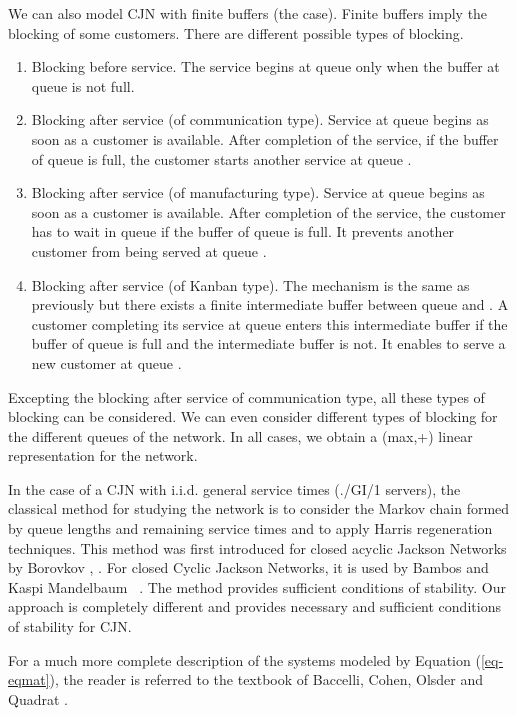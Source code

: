 \documentclass[11pt,titlepage]{article}
\newcommand{\parag}{\medskip\noindent}
\begin{document}
We can 
also model CJN with 
finite buffers (the  case).
Finite buffers imply the blocking of some customers. There are different
possible types of blocking.
\begin{enumerate}
\item Blocking before service. The service begins
at queue  only when the buffer at queue  is not full.
\item Blocking after service (of communication type). Service at queue 
begins as soon as a customer is available. After completion of the service,
if the buffer of queue  is full, the customer starts another service at
 queue .
\item Blocking after service (of manufacturing type). Service at queue 
begins as soon as a customer is available. After completion of the service,
the customer has to wait in queue  if the buffer of queue  is full.
It prevents another customer from being served at queue .
\item Blocking after service (of Kanban type). The mechanism is the same as
previously but there exists a finite intermediate buffer between queue  and
. A 
customer completing its service at queue  enters this intermediate buffer
if 
the buffer of queue  is full and the intermediate buffer is not. 
It enables to serve a new 
customer at queue .
\end{enumerate}
Excepting the blocking after service of communication type, all these types of
blocking can be considered. We can even consider different types of blocking
for the different queues of the network. In all cases, we obtain 
a (max,+) 
linear representation for the network.

\parag
In the case of a CJN with i.i.d. general
service 
times (./GI/1 servers), the classical method for studying the
network is to
consider the Markov chain formed by queue lengths and
remaining service times and to apply Harris regeneration techniques. 
This method was first introduced for closed
acyclic Jackson Networks by Borovkov \cite{boro86}, \cite{boro88}. For closed
Cyclic Jackson Networks, it is used by
Bambos \cite{bamb} and 
Kaspi  Mandelbaum \cite{KaMa92}~\cite{KaMa94}.
The method provides sufficient conditions of stability.
Our approach is completely different and provides
necessary and sufficient
conditions of
stability for CJN.

\parag

For a much more complete description of the systems modeled by 
Equation (\ref{eq-eqmat}), the
reader is referred to 
the textbook of Baccelli, Cohen, Olsder and Quadrat \cite{BCOQ}.
\end{document}
